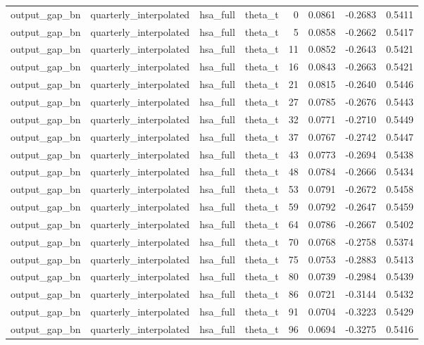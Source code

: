 \begin{tabular}{llllrrrr}
output\_gap\_bn & quarterly\_interpolated & hsa\_full & theta\_t & 0 & 0.0861 & -0.2683 & 0.5411 \\
output\_gap\_bn & quarterly\_interpolated & hsa\_full & theta\_t & 5 & 0.0858 & -0.2662 & 0.5417 \\
output\_gap\_bn & quarterly\_interpolated & hsa\_full & theta\_t & 11 & 0.0852 & -0.2643 & 0.5421 \\
output\_gap\_bn & quarterly\_interpolated & hsa\_full & theta\_t & 16 & 0.0843 & -0.2663 & 0.5421 \\
output\_gap\_bn & quarterly\_interpolated & hsa\_full & theta\_t & 21 & 0.0815 & -0.2640 & 0.5446 \\
output\_gap\_bn & quarterly\_interpolated & hsa\_full & theta\_t & 27 & 0.0785 & -0.2676 & 0.5443 \\
output\_gap\_bn & quarterly\_interpolated & hsa\_full & theta\_t & 32 & 0.0771 & -0.2710 & 0.5449 \\
output\_gap\_bn & quarterly\_interpolated & hsa\_full & theta\_t & 37 & 0.0767 & -0.2742 & 0.5447 \\
output\_gap\_bn & quarterly\_interpolated & hsa\_full & theta\_t & 43 & 0.0773 & -0.2694 & 0.5438 \\
output\_gap\_bn & quarterly\_interpolated & hsa\_full & theta\_t & 48 & 0.0784 & -0.2666 & 0.5434 \\
output\_gap\_bn & quarterly\_interpolated & hsa\_full & theta\_t & 53 & 0.0791 & -0.2672 & 0.5458 \\
output\_gap\_bn & quarterly\_interpolated & hsa\_full & theta\_t & 59 & 0.0792 & -0.2647 & 0.5459 \\
output\_gap\_bn & quarterly\_interpolated & hsa\_full & theta\_t & 64 & 0.0786 & -0.2667 & 0.5402 \\
output\_gap\_bn & quarterly\_interpolated & hsa\_full & theta\_t & 70 & 0.0768 & -0.2758 & 0.5374 \\
output\_gap\_bn & quarterly\_interpolated & hsa\_full & theta\_t & 75 & 0.0753 & -0.2883 & 0.5413 \\
output\_gap\_bn & quarterly\_interpolated & hsa\_full & theta\_t & 80 & 0.0739 & -0.2984 & 0.5439 \\
output\_gap\_bn & quarterly\_interpolated & hsa\_full & theta\_t & 86 & 0.0721 & -0.3144 & 0.5432 \\
output\_gap\_bn & quarterly\_interpolated & hsa\_full & theta\_t & 91 & 0.0704 & -0.3223 & 0.5429 \\
output\_gap\_bn & quarterly\_interpolated & hsa\_full & theta\_t & 96 & 0.0694 & -0.3275 & 0.5416 \\

\end{tabular}
